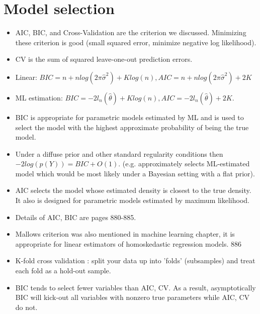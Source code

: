 \documentclass[11pt]{article} %
\begin{document}
\section{Model selection}
\begin{itemize}
\item AIC, BIC, and Cross-Validation are the criterion we discussed. Minimizing these criterion is good (small squared error, minimize negative log likelihood).
\item CV is the sum of squared leave-one-out prediction errors.
\item Linear: $BIC = n+nlog(2\pi\hat{\sigma}^2) + Klog(n), AIC = n + nlog(2\pi\hat{\sigma}^2) + 2K$
\item ML estimation: $BIC = -2l_n(\hat{\theta}) + Klog(n), AIC = -2l_n(\hat{\theta}) + 2K$.
\item BIC is appropriate for parametric models estimated by ML and is used to select the model with the highest approximate probability of being the true model.
\item Under a diffuse prior and other standard regularity conditions then $-2log(p(Y)) = BIC+O(1)$. (e.g. approximately selects ML-estimated model which would be most likely under a Bayesian setting with a flat prior).
\item AIC selects the model whose estimated density is closest to the true density. It also is designed for parametric models estimated by maximum likelihood.
\item Details of AIC, BIC are pages 880-885.
\item Mallows criterion was also mentioned in machine learning chapter, it is appropriate for linear estimators of homoskedastic regression models. 886
\item K-fold cross validation : split your data up into 'folds' (subsamples) and treat each fold as a hold-out sample.
\item BIC tends to select fewer variables than AIC, CV. As a result, asymptotically BIC will kick-out all variables with nonzero true parameters while AIC, CV do not.
\end{itemize}
\end{document}
